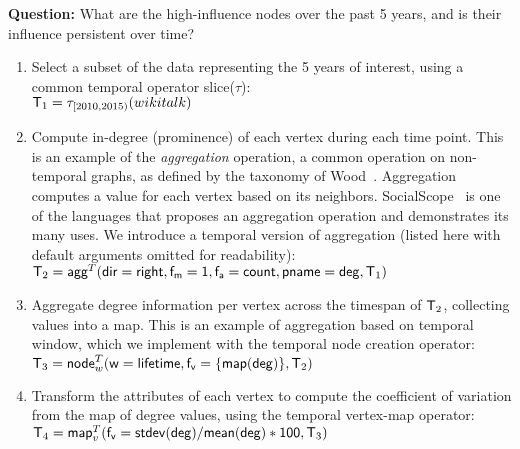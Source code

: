 {\bf Question:} What are the high-influence nodes over the past 5
years, and is their influence persistent over time?

\begin{enumerate}[noitemsep,itemindent=\dimexpr\labelwidth+\labelsep\relax,leftmargin=0pt]
\item Select a subset of the data representing the 5 years of
  interest, using a common temporal operator slice($\tau$):\\
%
$\mathsf{T}_1 = \tau_{[2010,2015)}(wikitalk)$

\item Compute in-degree (prominence) of each vertex during each time
  point.  This is an example of the {\em aggregation} operation, a
  common operation on non-temporal graphs, as defined by the taxonomy
  of Wood~\cite{Wood2012}.  Aggregation computes a value for each
  vertex based on its neighbors.  SocialScope~\cite{Amer-Yahia2009} is
  one of the languages that proposes an aggregation operation and
  demonstrates its many uses.  We introduce a temporal version of
  aggregation (listed here with default arguments omitted for
  readability):\\
%
$\mathsf{T}_2 = \textsf{agg}^T(\mathsf{dir=right},\mathsf{f_m=1},\mathsf{f_a=count},\mathsf{pname=deg},\mathsf{T}_1)$

\item Aggregate degree information per vertex across the timespan
  of $\mathsf{T}_2$, collecting values into a map.  This is an example of
  aggregation based on temporal window, which we implement with the
  temporal node creation operator:\\
$\mathsf{T}_3 =\textsf{node}^T_w(\mathsf{w=lifetime},\mathsf{f_v=\{map(deg)\}},\mathsf{T}_2)$

\item Transform the attributes of each vertex to compute the
  coefficient of variation from the map of degree values, using the
  temporal vertex-map operator:\\
$\mathsf{T}_4 = \textsf{map}^T_v(\mathsf{f_v=stdev(deg)/mean(deg)*100}, \mathsf{T}_3)$
\end{enumerate}

